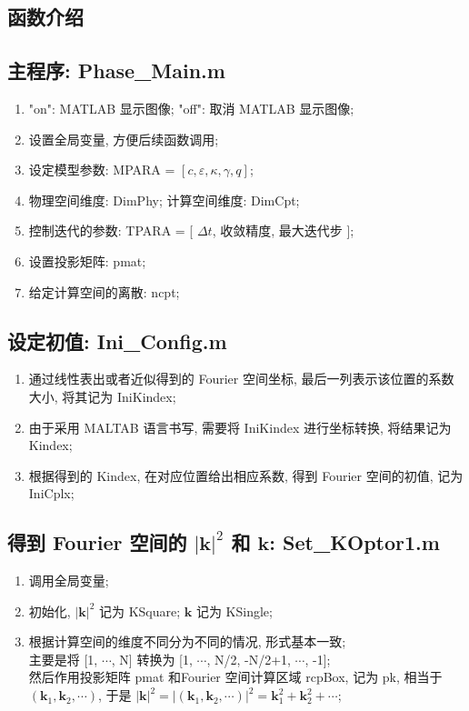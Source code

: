 \documentclass[12pt]{article}
\newcommand{\bk}{\mathbf{k}}
\numberwithin{equation}{section}
\begin{document}
\begin{CJK}{UTF8}{gkai}
\section{函数介绍}
\label{sec:Fun.Intr}

\subsection{主程序: Phase\_Main.m}
\begin{enumerate}[(1).]
	\item "on": MATLAB 显示图像; "off": 取消 MATLAB 显示图像;
	\item 设置全局变量, 方便后续函数调用;
	\item 设定模型参数: MPARA = $ [ c, \varepsilon, \kappa, \gamma, q ] $;
	\item 物理空间维度: DimPhy;	计算空间维度: DimCpt;
	\item 控制迭代的参数: TPARA = [ $ \Delta t $, 收敛精度, 最大迭代步 ];
	\item 设置投影矩阵: pmat;
	\item 给定计算空间的离散: ncpt;
\end{enumerate}


\subsection{设定初值: Ini\_Config.m}
\begin{enumerate}[(1).]
	\item 通过线性表出或者近似得到的 Fourier 空间坐标, 最后一列表示该位置的系数大小, 将其记为 IniKindex;
	\item 由于采用 MALTAB 语言书写, 需要将 IniKindex 进行坐标转换, 将结果记为 Kindex;
	\item 根据得到的 Kindex, 在对应位置给出相应系数, 得到 Fourier 空间的初值, 记为 IniCplx;
\end{enumerate}


\subsection{得到 Fourier 空间的 $ |\bk|^{2} $ 和 $ \bk $: Set\_KOptor1.m }
\begin{enumerate}[(1).]
	\item 调用全局变量;
	\item 初始化, $ |\bk|^{2} $ 记为 KSquare; $ \bk $ 记为 KSingle;
	\item 根据计算空间的维度不同分为不同的情况, 形式基本一致;\\
	主要是将 [1, $\cdots$, N] 转换为 [1, $\cdots$, N/2, -N/2+1, $\cdots$, -1];\\
	然后作用投影矩阵 pmat 和Fourier 空间计算区域 rcpBox, 记为 pk, 相当于 $ ( \bk_{1}, \bk_{2}, \cdots ) $, 于是 $ |\bk|^{2} = |( \bk_{1}, \bk_{2}, \cdots )|^{2} = \bk_{1}^{2} + \bk_{2}^{2} + \cdots $;
\end{enumerate}



\end{CJK}
\end{document}

